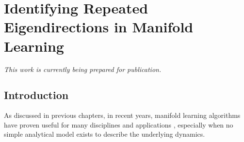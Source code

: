 
\chapter{Identifying Repeated Eigendirections in Manifold Learning \label{ch:harmonics}}

\graphicspath{{ch-harmonics/figures/}}

{\em This work is currently being prepared for publication.}


\section{Introduction}

As discussed in previous chapters, in recent years, manifold learning algorithms have proven useful for many disciplines and applications \cite{gepshtein2013image, fernandez2014diffusion, singer2011viewing, yuan2014automated, zhao2003face, trapnell2014dynamics, kemelmacher2011exploring, sifre2013rotation}, especially when no simple analytical model exists to describe the underlying dynamics.
%
%
